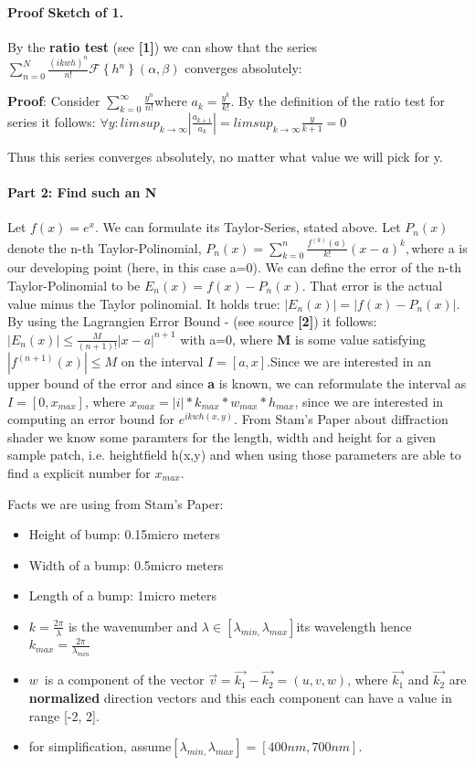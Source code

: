 \paragraph {Proof Sketch of 1.}

By the \textbf{ratio test} (see \textbf{{[}1{]}}) we can show that
the series $\sum_{n=0}^{N}\frac{(ikwh)^{n}}{n!}\mathcal{F}\left\{ h{}^{n}\right\} (\alpha,\beta)$
converges absolutely:

\textbf{Proof}: Consider $\sum_{k=0}^{\infty}\frac{y^{n}}{n!}$where
$a_{k}=\frac{y^{k}}{k!}$. By the definition of the ratio test for
series it follows: $\forall y:$$limsup_{k\rightarrow\infty}|\frac{a_{k+1}}{a_{k}}|=limsup_{k\rightarrow\infty}\frac{y}{k+1}=0$ 

Thus this series converges absolutely, no matter what value we will
pick for y.


\paragraph {Part 2: Find such an N}
Let $f(x)=e^{x}$. We can formulate its Taylor-Series, stated above.
Let $P_{n}(x)$denote the n-th Taylor-Polinomial, $P_{n}(x)=\sum_{k=0}^{n}\frac{f^{(k)}(a)}{k!}(x-a)^{k},$where
a is our developing point (here, in this case a=0). We can define
the error of the n-th Taylor-Polinomial to be $E_{n}(x)=f(x)-P_{n}(x)$.
That error is the actual value minus the Taylor polinomial. It holds
true: $|E_{n}(x)|=|f(x)-P_{n}(x)|$. By using the Lagrangien Error
Bound - (see source \textbf{{[}2{]}}) it follows: $|E_{n}(x)|\leq\frac{M}{(n+1)!}|x-a|^{n+1}$
with a=0, where \textbf{M }is some value satisfying $|f^{(n+1)}(x)|\leq M$
on the interval $I=[a,x]$.Since we are interested in an upper bound
of the error and since \textbf{a} is known, we can reformulate the
interval as $I=[0,x_{max}]$, where $x_{max}=|i|*k_{max}*w_{max}*h_{max}$,
since we are interested in computing an error bound for $e^{ikwh(x,y)}$.
From Stam's Paper about diffraction shader we know some paramters
for the length, width and height for a given sample patch, i.e. heightfield
h(x,y) and when using those parameters are able to find a explicit
number for $x_{max}$.

Facts we are using from Stam's Paper:

\begin{itemize}
\item Height of bump: 0.15micro meters
\item Width of a bump: 0.5micro meters
\item Length of a bump: 1micro meters
\item $k=\frac{2\pi}{\lambda}$ is the wavenumber and $\lambda\in[\lambda_{min,}\lambda_{max}]$its
wavelength hence $k_{max}=\frac{2\pi}{\lambda_{min}}$ 
\item $w$~is a component of the vector $\vec{v}=\vec{k_{1}}-\vec{k_{2}}=(u,v,w)$,
where $\vec{k_{1}}$ and $\vec{k_{2}}$ are \textbf{normalized} direction
vectors and this each component can have a value in range {[}-2, 2{]}.
\item for simplification, assume$[\lambda_{min,}\lambda_{max}]=[400nm,700nm].$
\end{itemize}

